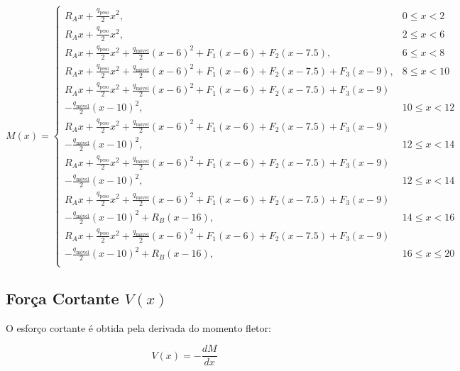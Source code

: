 \begin{equation}
    M(x) =
    \begin{cases}
        R_A x + \frac{q_{\text{peso}}}{2} x^2, & 0 \leq x < 2 \\
        R_A x + \frac{q_{\text{peso}}}{2} x^2, & 2 \leq x < 6 \\
        R_A x + \frac{q_{\text{peso}}}{2} x^2 + \frac{q_{\text{móvel}}}{2} (x - 6)^2 + F_1 (x - 6) + F_2 (x - 7.5), & 6 \leq x < 8 \\
        R_A x + \frac{q_{\text{peso}}}{2} x^2 + \frac{q_{\text{móvel}}}{2} (x - 6)^2 + F_1 (x - 6) + F_2 (x - 7.5) + F_3 (x - 9), & 8 \leq x < 10 \\
        R_A x + \frac{q_{\text{peso}}}{2} x^2 + \frac{q_{\text{móvel}}}{2} (x - 6)^2 + F_1 (x - 6) + F_2 (x - 7.5) + F_3 (x - 9) \\ - \frac{q_{\text{móvel}}}{2} (x - 10)^2, & 10 \leq x < 12\\
        R_A x + \frac{q_{\text{peso}}}{2} x^2 + \frac{q_{\text{móvel}}}{2} (x - 6)^2 + F_1 (x - 6) + F_2 (x - 7.5) + F_3 (x - 9) \\ - \frac{q_{\text{móvel}}}{2} (x - 10)^2, & 12 \leq x < 14\\
        R_A x + \frac{q_{\text{peso}}}{2} x^2 + \frac{q_{\text{móvel}}}{2} (x - 6)^2 + F_1 (x - 6) + F_2 (x - 7.5) + F_3 (x - 9) \\ - \frac{q_{\text{móvel}}}{2} (x - 10)^2, & 12 \leq x < 14\\
        R_A x + \frac{q_{\text{peso}}}{2} x^2 + \frac{q_{\text{móvel}}}{2} (x - 6)^2 + F_1 (x - 6) + F_2 (x - 7.5) + F_3 (x - 9) \\ - \frac{q_{\text{móvel}}}{2} (x - 10)^2 + R_B (x-16), & 14 \leq x < 16\\
        R_A x + \frac{q_{\text{peso}}}{2} x^2 + \frac{q_{\text{móvel}}}{2} (x - 6)^2 + F_1 (x - 6) + F_2 (x - 7.5) + F_3 (x - 9) \\ - \frac{q_{\text{móvel}}}{2} (x - 10)^2 + R_B (x-16), & 16 \leq x \leq 20\\
    \end{cases}
\end{equation}

\subsection{Força Cortante \( V(x) \)}
O esforço cortante é obtida pela derivada do momento fletor:

\begin{equation}
    V(x) = -\frac{dM}{dx}
\end{equation}

